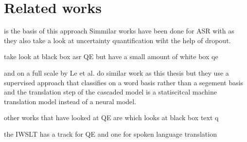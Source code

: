 
\chapter{Related works}
\label{ch:relatecworks}
\cite{fomicheva2020unsupervised} is the basis of this approach
Simmilar works have been done for ASR with \cite{8683086} as they also take a look at uncertainty quantification wiht the help of dropout. 

\cite{negri-etal-2014-quality} take look at black box asr QE but have a small amount of white box qe

and on a full scale by 
Le et al. \cite{le2016automatic} do similar work as this thesis but they use a supervised approach that classifies on a word basis rather than a segement basis and the translation step of the cascaded model is a statiscitcal machine translation model instead of a neural model. 

other works that have looked at QE are \cite{dinh2023perturbationbasedqeexplainableunsupervised} which looks at black box text q

the IWSLT has a track for QE and one for spoken language translation 
